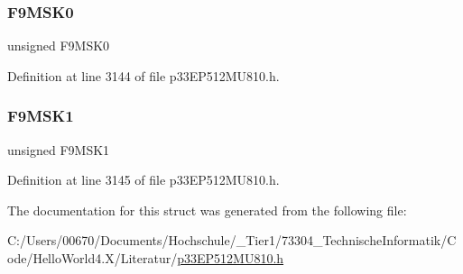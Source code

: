 \subsubsection{\texorpdfstring{F9\+M\+S\+K0}{F9MSK0}}
{\footnotesize\ttfamily unsigned F9\+M\+S\+K0}



Definition at line 3144 of file p33\+E\+P512\+M\+U810.\+h.

\mbox{\label{structtag_c1_f_m_s_k_s_e_l2_b_i_t_s_a0a50875460baa60f96ea09203b5aa366}} 
\subsubsection{\texorpdfstring{F9\+M\+S\+K1}{F9MSK1}}
{\footnotesize\ttfamily unsigned F9\+M\+S\+K1}



Definition at line 3145 of file p33\+E\+P512\+M\+U810.\+h.



The documentation for this struct was generated from the following file\+:\begin{DoxyCompactItemize}
\item 
C\+:/\+Users/00670/\+Documents/\+Hochschule/\+\_\+\+Tier1/73304\+\_\+\+Technische\+Informatik/\+Code/\+Hello\+World4.\+X/\+Literatur/\hyperlink{p33_e_p512_m_u810_8h}{p33\+E\+P512\+M\+U810.\+h}\end{DoxyCompactItemize}

